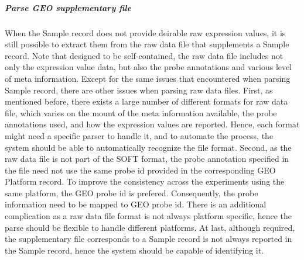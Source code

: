 \subparagraph{\textit{Parse GEO supplementary file}}

When the Sample record does not provide deirable raw expression values, it is
still possible to extract them from the raw data file that supplements a
Sample record.
%
Note that designed to be self-contained, the raw data file includes not only
the expression value data, but also the probe annotations and various level
of meta information.
%
Except for the same issues that encountered when parsing Sample record, there
are other issues when parsing raw data files.
First, as mentioned before, there exists a large number of different formats
for raw data file, which varies on the mount of the meta information
available, the probe annotations used, and how the expression values are
reported.
%
Hence, each format might need a specific parser to handle it, and to automate
the process, the system should be able to automatically recognize the file
format.
Second, as the raw data file is not part of the SOFT format, the probe
annotation specified in the file need not use the same probe id provided in
the corresponding GEO Platform record.
%
To improve the consistency across the experiments using the same platform,
the GEO probe id is prefered.
%
Consequently, the probe information need to be mapped to GEO probe id.
%
There is an additional complication as a raw data file format is not always
platform specific, hence the parse should be flexible to handle different
platforms.
%
At last, although required, the supplementary file corresponds to a Sample
record is not always reported in the Sample record, hence the system should
be capable of identifying it.


